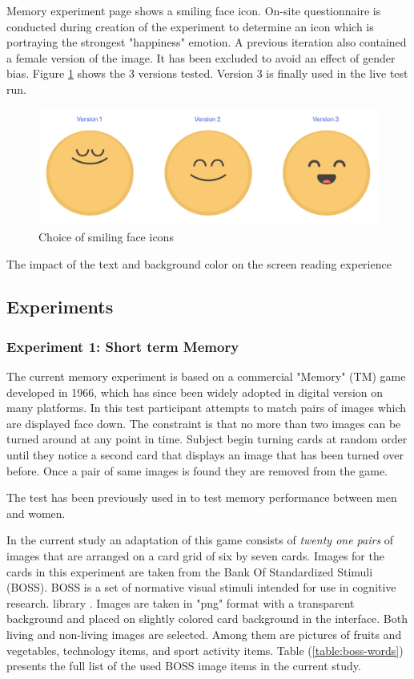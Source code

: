 	Memory experiment page shows a smiling face icon. On-site questionnaire is conducted during creation of the experiment to determine an icon which is portraying the strongest "happiness" emotion. A previous iteration also contained a female version of the image. It has been excluded to avoid an effect of gender bias. Figure \ref{fig:smiling-icons} shows the 3 versions tested. Version 3 is finally used in the live test run.
	
	\begin{figure}[h]
		\centering
		\includegraphics[width=0.7\linewidth]{graphics/smiling-icons}
		\caption{Choice of smiling face icons}
		\label{fig:smiling-icons}
	\end{figure}
	

	\cite{Zorko2017} The impact of the text and background color on the screen reading experience
	
	\clearpage
	\subsection{Experiments}

		\subsubsection{Experiment 1: Short term Memory} \label{sec:memory}
		
		The current memory experiment is based on a commercial "Memory" (TM) game developed in 1966, which has since been widely adopted in digital version on many platforms. 
		In this test participant attempts to match pairs of images which are displayed face down. 
		The constraint is that no more than two images can be turned around at any point in time. Subject begin turning cards at random order until they notice a second card that displays an image that has been turned over before. Once a pair of same images is found they are removed from the game.
		
		The test has been previously used in \cite{McBurney1997} to test memory performance between men and women.
		
		In the current study an adaptation of this game consists of \textit{twenty one pairs} of images that are arranged on a card grid of six by seven cards. Images for the cards in this experiment are taken from the Bank Of Standardized Stimuli (BOSS). BOSS is a set of normative visual stimuli intended for use in cognitive research. library \cite{Brodeur2010}. Images are taken in "png" format with a transparent background and placed on slightly colored card background in the interface. Both living and non-living images are selected. Among them are pictures of fruits and vegetables, technology items, and sport activity items.
		Table (\ref{table:boss-words}) presents the full list of the used BOSS image items in the current study.
		
